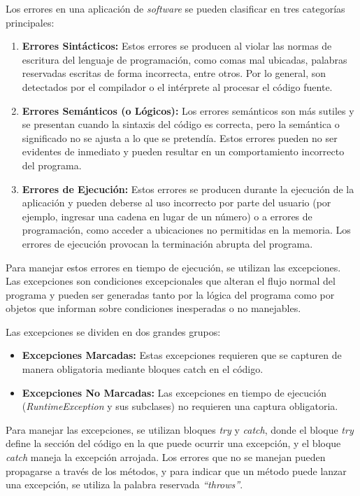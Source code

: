 \documentclass[11pt, twocolumn]{article}
\begin{document}
  Los errores en una aplicación de \textit{software} se pueden clasificar en tres categorías principales:
  \begin{enumerate}
    \item \textbf{Errores Sintácticos:} Estos errores se producen al violar las normas de escritura del lenguaje de programación, como comas mal ubicadas, palabras reservadas escritas de forma incorrecta, entre otros. Por lo general, son detectados por el compilador o el intérprete al procesar el código fuente.
    \item \textbf{Errores Semánticos (o Lógicos):} Los errores semánticos son más sutiles y se presentan cuando la sintaxis del código es correcta, pero la semántica o significado no se ajusta a lo que se pretendía. Estos errores pueden no ser evidentes de inmediato y pueden resultar en un comportamiento incorrecto del programa.
    \item \textbf{Errores de Ejecución:} Estos errores se producen durante la ejecución de la aplicación y pueden deberse al uso incorrecto por parte del usuario (por ejemplo, ingresar una cadena en lugar de un número) o a errores de programación, como acceder a ubicaciones no permitidas en la memoria. Los errores de ejecución provocan la terminación abrupta del programa.
  \end{enumerate}

  Para manejar estos errores en tiempo de ejecución, se utilizan las excepciones. Las excepciones son condiciones excepcionales que alteran el flujo normal del programa y pueden ser generadas tanto por la lógica del programa como por objetos que informan sobre condiciones inesperadas o no manejables.
  
  Las excepciones se dividen en dos grandes grupos:
  \begin{itemize}
    \item \textbf{Excepciones Marcadas:} Estas excepciones requieren que se capturen de manera obligatoria mediante bloques catch en el código.
    \item \textbf{Excepciones No Marcadas:} Las excepciones en tiempo de ejecución (\textit{RuntimeException} y sus subclases) no requieren una captura obligatoria.
  \end{itemize}

  Para manejar las excepciones, se utilizan bloques \textit{try} y \textit{catch}, donde el bloque \textit{try} define la sección del código en la que puede ocurrir una excepción, y el bloque \textit{catch} maneja la excepción arrojada. Los errores que no se manejan pueden propagarse a través de los métodos, y para indicar que un método puede lanzar una excepción, se utiliza la palabra reservada \textit{``throws''}.
\end{document}
